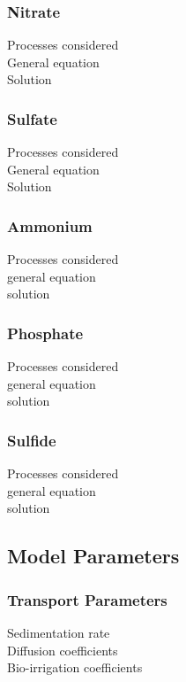 \documentclass[gmd, manuscript]{copernicus}
\begin{document}
\subsubsection{Nitrate}
Processes considered\\
General equation\\
Solution\\

\subsubsection{Sulfate}
Processes considered\\
General equation\\
Solution\\

\subsubsection{Ammonium}
Processes considered\\
general equation\\
solution\\

\subsubsection{Phosphate}
Processes considered\\
general equation\\
solution\\

\subsubsection{Sulfide}
Processes considered\\
general equation\\
solution\\

\subsection{Model Parameters}
\subsubsection{Transport Parameters}
Sedimentation rate\\
Diffusion coefficients\\
Bio-irrigation coefficients\\
\end{document}
